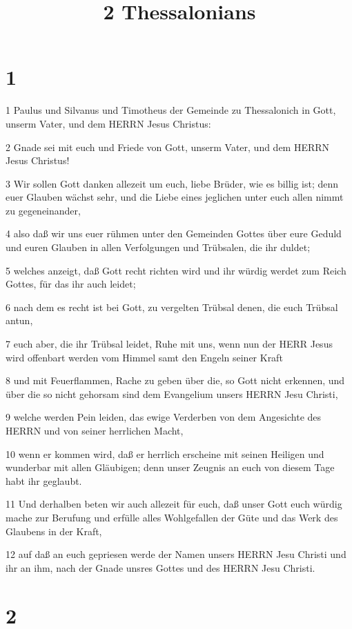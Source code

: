 

\title{2 Thessalonians}


\chapter{1}

\par 1 Paulus und Silvanus und Timotheus der Gemeinde zu Thessalonich in Gott, unserm Vater, und dem HERRN Jesus Christus:
\par 2 Gnade sei mit euch und Friede von Gott, unserm Vater, und dem HERRN Jesus Christus!
\par 3 Wir sollen Gott danken allezeit um euch, liebe Brüder, wie es billig ist; denn euer Glauben wächst sehr, und die Liebe eines jeglichen unter euch allen nimmt zu gegeneinander,
\par 4 also daß wir uns euer rühmen unter den Gemeinden Gottes über eure Geduld und euren Glauben in allen Verfolgungen und Trübsalen, die ihr duldet;
\par 5 welches anzeigt, daß Gott recht richten wird und ihr würdig werdet zum Reich Gottes, für das ihr auch leidet;
\par 6 nach dem es recht ist bei Gott, zu vergelten Trübsal denen, die euch Trübsal antun,
\par 7 euch aber, die ihr Trübsal leidet, Ruhe mit uns, wenn nun der HERR Jesus wird offenbart werden vom Himmel samt den Engeln seiner Kraft
\par 8 und mit Feuerflammen, Rache zu geben über die, so Gott nicht erkennen, und über die so nicht gehorsam sind dem Evangelium unsers HERRN Jesu Christi,
\par 9 welche werden Pein leiden, das ewige Verderben von dem Angesichte des HERRN und von seiner herrlichen Macht,
\par 10 wenn er kommen wird, daß er herrlich erscheine mit seinen Heiligen und wunderbar mit allen Gläubigen; denn unser Zeugnis an euch von diesem Tage habt ihr geglaubt.
\par 11 Und derhalben beten wir auch allezeit für euch, daß unser Gott euch würdig mache zur Berufung und erfülle alles Wohlgefallen der Güte und das Werk des Glaubens in der Kraft,
\par 12 auf daß an euch gepriesen werde der Namen unsers HERRN Jesu Christi und ihr an ihm, nach der Gnade unsres Gottes und des HERRN Jesu Christi.

\chapter{2}

